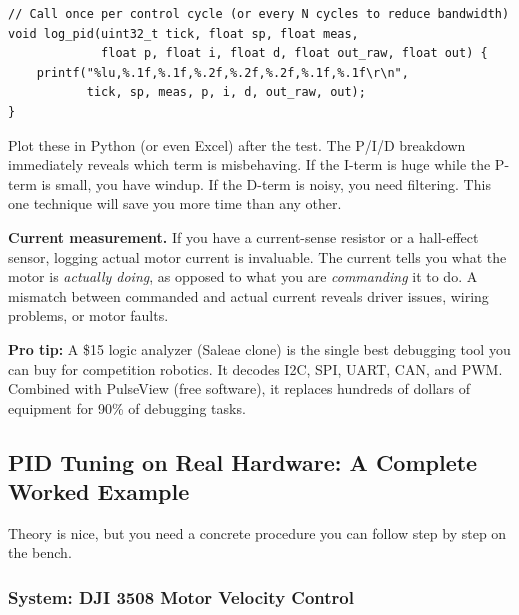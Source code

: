 \begin{verbatim}
// Call once per control cycle (or every N cycles to reduce bandwidth)
void log_pid(uint32_t tick, float sp, float meas,
             float p, float i, float d, float out_raw, float out) {
    printf("%lu,%.1f,%.1f,%.2f,%.2f,%.2f,%.1f,%.1f\r\n",
           tick, sp, meas, p, i, d, out_raw, out);
}
\end{verbatim}

Plot these in Python (or even Excel) after the test. The P/I/D breakdown immediately reveals which term is misbehaving. If the I-term is huge while the P-term is small, you have windup. If the D-term is noisy, you need filtering. This one technique will save you more time than any other.

\textbf{Current measurement.} If you have a current-sense resistor or a hall-effect sensor, logging actual motor current is invaluable. The current tells you what the motor is \textit{actually doing}, as opposed to what you are \textit{commanding} it to do. A mismatch between commanded and actual current reveals driver issues, wiring problems, or motor faults.

\textbf{Pro tip:} A \$15 logic analyzer (Saleae clone) is the single best debugging tool you can buy for competition robotics. It decodes I2C, SPI, UART, CAN, and PWM. Combined with PulseView (free software), it replaces hundreds of dollars of equipment for 90\% of debugging tasks.

\subsection{PID Tuning on Real Hardware: A Complete Worked Example}

Theory is nice, but you need a concrete procedure you can follow step by step on the bench.

\subsubsection{System: DJI 3508 Motor Velocity Control}


